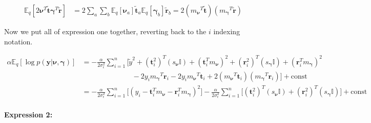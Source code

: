 \documentclass[letterpaper,12pt]{article}
\newcommand{\lp}{\left (} %
\newcommand{\rp}{\right )} %
\newcommand{\lb}{\left [} %
\newcommand{\rb}{\right ]} %
\newcommand{\sigmaepsilon}{\sigma_\epsilon^2} %
\newcommand{\nuv}{\boldsymbol{\nu}} %
\newcommand{\gammav}{\boldsymbol{\gamma}} %
\newcommand{\ti}{\boldsymbol{t}_i} %
\newcommand{\ri}{\boldsymbol{r}_i} %
\newcommand{\ytilde}{\ensuremath{\tilde{y}}} %
\newcommand{\ttilde}{\ensuremath{\tilde{\boldsymbol{t}}}} %
\newcommand{\rtilde}{\ensuremath{\tilde{\boldsymbol{r}}}} %
\newcommand{\mnu}{\ensuremath{m_\nuv}} %
\newcommand{\snu}{\ensuremath{s_\nuv}} %
\newcommand{\mgamma}{m_\gammav} %
\newcommand{\sgamma}{\ensuremath{s_\gammav}} %
\newcommand{\nua}{\ensuremath{\nuv_a}} %
\newcommand{\tatilde}{\ensuremath{\ttilde_a}} %
\newcommand{\rbtilde}{\ensuremath{\rtilde_b}} %
\newcommand{\E}{\mathbb{E}_q}
\begin{document}
\begin{equation}
\begin{split}
    \E \lb 2 \nuv^T \ttilde \gammav^T \rtilde \rb &= 2 \sum_a \sum_b \E \lb \nua \rb  \tatilde \E \lb \gammav_b \rb \rbtilde = 2 \lp {\mnu}^T \ttilde \rp \lp {\mgamma}^T \rtilde \rp 
\end{split}
\end{equation}


Now we put all of expression one together, reverting back to the $i$ indexing notation.

\begin{equation}
\begin{split}
    \alpha \E \lb \log p(\boldsymbol{y} | \nuv, \gammav) \rb &= -\frac{\alpha}{2 \sigmaepsilon} \sum_{i=1}^n \Bigg[\ytilde^2 +  (\ti^2)^T ({\snu} \mathbb{I}) + (\ti^T   m_{\nuv})^2 + (\ri^2)^T ({\sgamma} \mathbb{I}) + (\ri^T   m_{\gammav})^2  \\
    & \qquad \qquad \qquad \quad -2 y_i {\mgamma}^T \ri - 2 y_i {\mnu}^T \ti + 2 \lp {\mnu}^T \ti \rp \lp {\mgamma}^T \ri \rp \Bigg] + \textrm{const} \\
    &= -\frac{\alpha}{2 \sigmaepsilon} \sum_{i=1}^n \Bigg[(y_i - \ti^T   m_{\nuv} - \ri^T   m_{\gammav})^2 \Bigg] -\frac{\alpha}{2 \sigmaepsilon} \sum_{i=1}^n \Bigg[ (\ti^2)^T ({\snu} \mathbb{I}) +  (\ri^2)^T ({\sgamma} \mathbb{I}) \Bigg] + \textrm{const} \\
\end{split}
\end{equation}

\textbf{Expression 2:}
\end{document}
